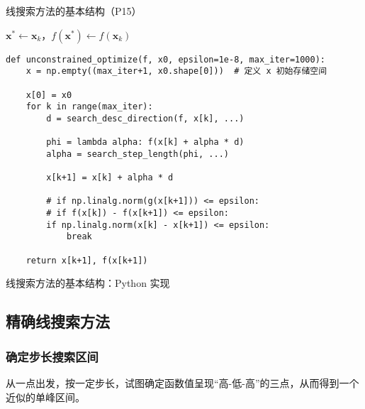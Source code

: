 \documentclass[cn]{elegantbook}
\begin{document}
\begin{algorithm}
    \caption{线搜索方法的基本结构（P15）}
    $\mathbf{x}^{*}\leftarrow\mathbf{x}_{k}$，$f\left(\mathbf{x}^{*}\right)\leftarrow f\left(\mathbf{x}_{k}\right)$\;
\end{algorithm}

\begin{listing}
    \begin{verbatim}
def unconstrained_optimize(f, x0, epsilon=1e-8, max_iter=1000):
    x = np.empty((max_iter+1, x0.shape[0]))  # 定义 x 初始存储空间

    x[0] = x0
    for k in range(max_iter):
        d = search_desc_direction(f, x[k], ...)

        phi = lambda alpha: f(x[k] + alpha * d)
        alpha = search_step_length(phi, ...)

        x[k+1] = x[k] + alpha * d

        # if np.linalg.norm(g(x[k+1])) <= epsilon:
        # if f(x[k]) - f(x[k+1]) <= epsilon:
        if np.linalg.norm(x[k] - x[k+1]) <= epsilon:
            break

    return x[k+1], f(x[k+1])
    \end{verbatim}
    \caption{线搜索方法的基本结构：Python 实现}
\end{listing}

\subsection{精确线搜索方法}

\subsubsection{确定步长搜索区间}

从一点出发，按一定步长，试图确定函数值呈现“高-低-高”的三点，从而得到一个近似的单峰区间。
\end{document}
